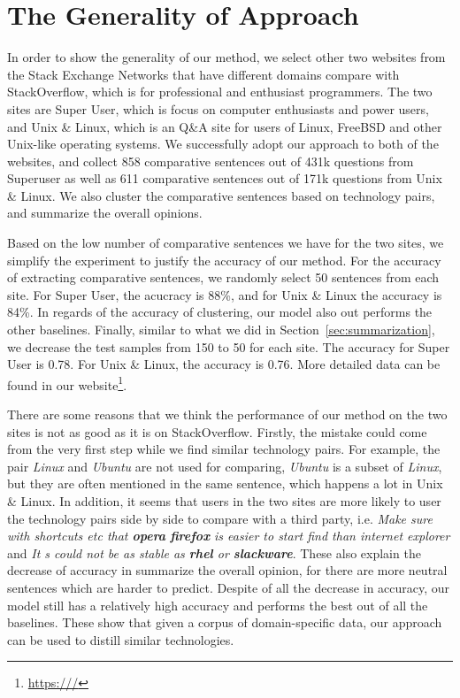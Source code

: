\section{The Generality of Approach}
In order to show the generality of our method, we select other two websites from the Stack Exchange Networks that have different domains compare with StackOverflow, which is for professional and enthusiast programmers. The two sites are Super User, which is focus on computer enthusiasts and power users, and Unix \& Linux, which is an Q\&A site for users of Linux, FreeBSD and other Unix-like operating systems. We successfully adopt our approach to both of the websites, and collect 858 comparative sentences out of 431k questions from Superuser as well as 611 comparative sentences out of 171k questions from Unix \& Linux. We also cluster the comparative sentences based on technology pairs, and summarize the overall opinions.

Based on the low number of comparative sentences we have for the two sites, we simplify the experiment to justify the accuracy of our method. For the accuracy of extracting comparative sentences, we randomly select 50 sentences from each site. For Super User, the acucracy is 88\%, and for Unix \& Linux the accuracy is 84\%. In regards of the accuracy of clustering, our model also out performs the other baselines. Finally, similar to what we did in Section~\ref{sec:summarization}, we decrease the test samples from 150 to 50 for each site. The accuracy for Super User is 0.78. For Unix \& Linux, the accuracy is 0.76. More detailed data can be found in our website\footnote{\url{https:///}}.

There are some reasons that we think the performance of our method on the two sites is not as good as it is on StackOverflow. Firstly, the mistake could come from the very first step while we find similar technology pairs. For example, the pair \textit{Linux} and \textit{Ubuntu} are not used for comparing, \textit{Ubuntu} is a subset of \textit{Linux}, but they are often mentioned in the same sentence, which happens a lot in Unix \& Linux. In addition, it seems that users in the two sites are more likely to user the technology pairs side by side to compare with a third party, i.e. \textit{Make sure with shortcuts etc that \textbf{opera} \textbf{firefox} is easier to start find than internet explorer} and \textit{It s could not be as stable as \textbf{rhel} or \textbf{slackware}}. These also explain the decrease of accuracy in summarize the overall opinion, for there are more neutral sentences which are harder to predict. Despite of all the decrease in accuracy, our model still has a relatively high accuracy and performs the best out of all the baselines. These show that
given a corpus of domain-specific data, our approach can be
used to distill similar technologies. 